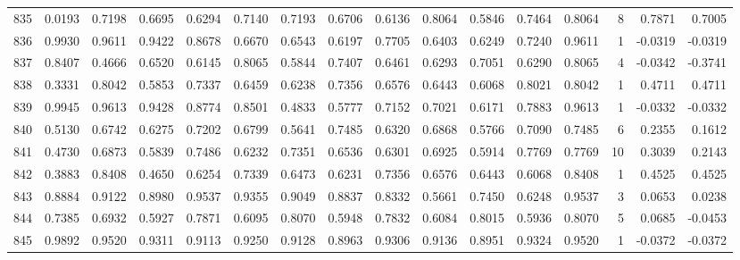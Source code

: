 \begin{tabular}{lrrrrrrrrrrrrrrr}
835 &      0.0193 &  0.7198 &  0.6695 &  0.6294 &  0.7140 &  0.7193 &  0.6706 &  0.6136 &  0.8064 &  0.5846 &   0.7464 &     0.8064 &      8 &                    0.7871 &                     0.7005 \\
836 &      0.9930 &  0.9611 &  0.9422 &  0.8678 &  0.6670 &  0.6543 &  0.6197 &  0.7705 &  0.6403 &  0.6249 &   0.7240 &     0.9611 &      1 &                   -0.0319 &                    -0.0319 \\
837 &      0.8407 &  0.4666 &  0.6520 &  0.6145 &  0.8065 &  0.5844 &  0.7407 &  0.6461 &  0.6293 &  0.7051 &   0.6290 &     0.8065 &      4 &                   -0.0342 &                    -0.3741 \\
838 &      0.3331 &  0.8042 &  0.5853 &  0.7337 &  0.6459 &  0.6238 &  0.7356 &  0.6576 &  0.6443 &  0.6068 &   0.8021 &     0.8042 &      1 &                    0.4711 &                     0.4711 \\
839 &      0.9945 &  0.9613 &  0.9428 &  0.8774 &  0.8501 &  0.4833 &  0.5777 &  0.7152 &  0.7021 &  0.6171 &   0.7883 &     0.9613 &      1 &                   -0.0332 &                    -0.0332 \\
840 &      0.5130 &  0.6742 &  0.6275 &  0.7202 &  0.6799 &  0.5641 &  0.7485 &  0.6320 &  0.6868 &  0.5766 &   0.7090 &     0.7485 &      6 &                    0.2355 &                     0.1612 \\
841 &      0.4730 &  0.6873 &  0.5839 &  0.7486 &  0.6232 &  0.7351 &  0.6536 &  0.6301 &  0.6925 &  0.5914 &   0.7769 &     0.7769 &     10 &                    0.3039 &                     0.2143 \\
842 &      0.3883 &  0.8408 &  0.4650 &  0.6254 &  0.7339 &  0.6473 &  0.6231 &  0.7356 &  0.6576 &  0.6443 &   0.6068 &     0.8408 &      1 &                    0.4525 &                     0.4525 \\
843 &      0.8884 &  0.9122 &  0.8980 &  0.9537 &  0.9355 &  0.9049 &  0.8837 &  0.8332 &  0.5661 &  0.7450 &   0.6248 &     0.9537 &      3 &                    0.0653 &                     0.0238 \\
844 &      0.7385 &  0.6932 &  0.5927 &  0.7871 &  0.6095 &  0.8070 &  0.5948 &  0.7832 &  0.6084 &  0.8015 &   0.5936 &     0.8070 &      5 &                    0.0685 &                    -0.0453 \\
845 &      0.9892 &  0.9520 &  0.9311 &  0.9113 &  0.9250 &  0.9128 &  0.8963 &  0.9306 &  0.9136 &  0.8951 &   0.9324 &     0.9520 &      1 &                   -0.0372 &                    -0.0372 \\

\end{tabular}
